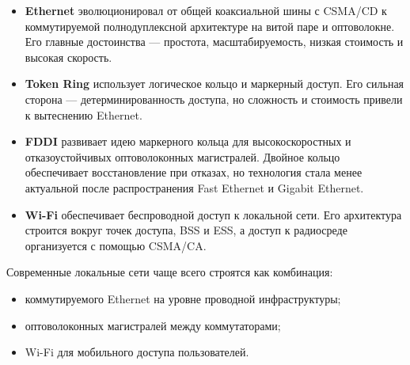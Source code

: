 \documentclass[12pt,a4paper]{article}
\begin{document}
\begin{itemize}
    \item \textbf{Ethernet} эволюционировал от общей коаксиальной шины с CSMA/CD к коммутируемой полнодуплексной архитектуре на витой паре и оптоволокне. Его главные достоинства --- простота, масштабируемость, низкая стоимость и высокая скорость.
    \item \textbf{Token Ring} использует логическое кольцо и маркерный доступ. Его сильная сторона --- детерминированность доступа, но сложность и стоимость привели к вытеснению Ethernet.
    \item \textbf{FDDI} развивает идею маркерного кольца для высокоскоростных и отказоустойчивых оптоволоконных магистралей. Двойное кольцо обеспечивает восстановление при отказах, но технология стала менее актуальной после распространения Fast Ethernet и Gigabit Ethernet.
    \item \textbf{Wi-Fi} обеспечивает беспроводной доступ к локальной сети. Его архитектура строится вокруг точек доступа, BSS и ESS, а доступ к радиосреде организуется с помощью CSMA/CA.
\end{itemize}

Современные локальные сети чаще всего строятся как комбинация:
\begin{itemize}
    \item коммутируемого Ethernet на уровне проводной инфраструктуры;
    \item оптоволоконных магистралей между коммутаторами;
    \item Wi-Fi для мобильного доступа пользователей.
\end{itemize}
\end{document}
